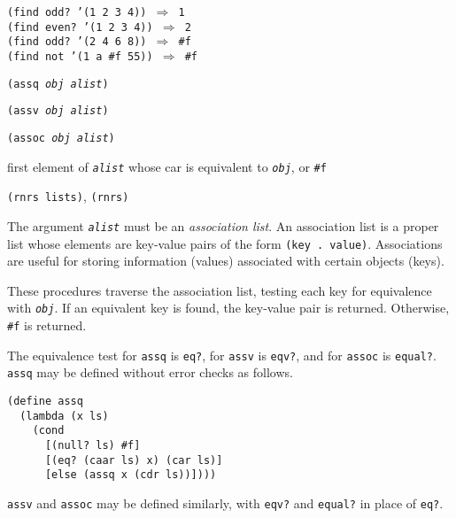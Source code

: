 \begin{alltt}
(find odd? '(1 2 3 4)) \(\Rightarrow\) 1
(find even? '(1 2 3 4)) \(\Rightarrow\) 2
(find odd? '(2 4 6 8)) \(\Rightarrow\) \#{}f
(find not '(1 a \#{}f 55)) \(\Rightarrow\) \#{}f
\end{alltt}

\begin{description}

\label{objects_s58}\label{objects_page_assq}
\item[procedure] \texttt{(assq \textit{obj} \textit{alist})}



\item[procedure] \texttt{(assv \textit{obj} \textit{alist})}



\item[procedure] \texttt{(assoc \textit{obj} \textit{alist})}



\item[returns] first element of \texttt{\textit{alist}} whose car is equivalent to \texttt{\textit{obj}}, or \texttt{\#{}f}


\item[libraries] \texttt{(rnrs lists)}, \texttt{(rnrs)}
\end{description}


The argument \texttt{\textit{alist}} must be an \label{objects_s59}\textit{association list}.
An association list is a proper list whose elements are key-value pairs
of the form \texttt{(key . value)}.
Associations are useful for storing information (values) associated with
certain objects (keys).


These procedures traverse the association list, testing each key for equivalence
with \texttt{\textit{obj}}.
If an equivalent key is found, the key-value pair is returned.
Otherwise, \texttt{\#{}f} is returned.


The equivalence test for \texttt{assq} is \texttt{eq?},
for \texttt{assv} is \texttt{eqv?},
and for \texttt{assoc} is \texttt{equal?}.
\texttt{assq} may be defined without error checks as follows.


\begin{alltt}
(define assq
  (lambda (x ls)
    (cond
      [(null? ls) \#{}f]
      [(eq? (caar ls) x) (car ls)]
      [else (assq x (cdr ls))])))
\end{alltt}

\texttt{assv} and \texttt{assoc} may be defined similarly, with \texttt{eqv?} and \texttt{equal?}
in place of \texttt{eq?}.

